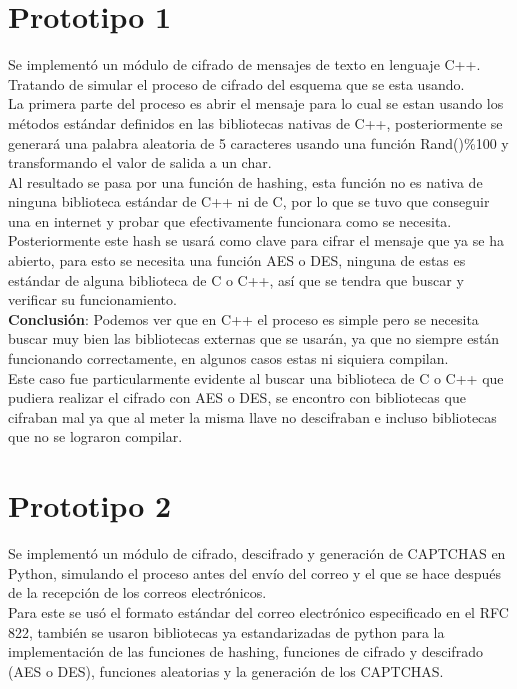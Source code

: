 \documentclass[12pt,oneside,onecolumn,openany]{report}
\begin{document}
\section{Prototipo 1}
Se implementó un módulo de cifrado de mensajes de texto en lenguaje C++. Tratando de simular el proceso de cifrado del esquema que se esta usando.\\
La primera parte del proceso es abrir el mensaje para lo cual se estan usando los métodos estándar definidos en las bibliotecas nativas de C++, posteriormente se generará una palabra aleatoria de 5 caracteres usando una función Rand()\%100 y transformando el valor de salida a un char.\\
Al resultado se pasa por una función de hashing, esta función no es nativa de ninguna biblioteca estándar de C++ ni de C, por lo que se tuvo que conseguir una en internet y probar que efectivamente funcionara como se necesita.\\
Posteriormente este hash se usará como clave para cifrar el mensaje que ya se ha abierto, para esto se necesita una función AES o DES, ninguna de estas es estándar de alguna biblioteca de C o C++, así que se tendra que buscar y verificar su funcionamiento.\\


\textbf{Conclusión}:
Podemos ver que en C++ el proceso es simple pero se necesita buscar muy bien las bibliotecas externas que se usarán, ya que no siempre están funcionando correctamente, en algunos casos estas ni siquiera compilan.\\
Este caso fue particularmente evidente al buscar una biblioteca de C o C++ que pudiera realizar el cifrado con AES o DES, se encontro con bibliotecas que cifraban mal ya que al meter la misma llave no descifraban e incluso bibliotecas que no se lograron compilar.\\

\section{Prototipo 2}
Se implementó un módulo de cifrado, descifrado y generación de CAPTCHAS en Python, simulando el proceso antes del envío del correo y el que se hace después de la recepción de los correos electrónicos.\\
Para este se usó el formato estándar del correo electrónico especificado en el RFC 822, también se usaron bibliotecas ya estandarizadas de python para la implementación de las funciones de hashing, funciones de cifrado y descifrado (AES o DES), funciones aleatorias y la generación de los CAPTCHAS.\\
\end{document}
